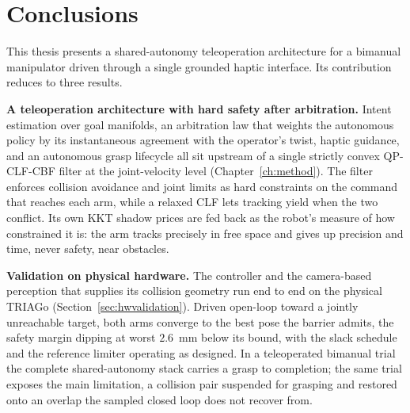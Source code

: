 \chapter{Conclusions}
\label{ch:conclusions}

This thesis presents a shared-autonomy teleoperation architecture for a bimanual manipulator driven through a single grounded haptic interface. Its contribution reduces to three results.

\textbf{A teleoperation architecture with hard safety after arbitration.} Intent estimation over goal manifolds, an arbitration law that weights the autonomous policy by its instantaneous agreement with the operator's twist, haptic guidance, and an autonomous grasp lifecycle all sit upstream of a single strictly convex QP-CLF-CBF filter at the joint-velocity level (Chapter~\ref{ch:method}). The filter enforces collision avoidance and joint limits as hard constraints on the command that reaches each arm, while a relaxed CLF lets tracking yield when the two conflict. Its own KKT shadow prices are fed back as the robot's measure of how constrained it is: the arm tracks precisely in free space and gives up precision and time, never safety, near obstacles.

\textbf{Validation on physical hardware.} The controller and the camera-based perception that supplies its collision geometry run end to end on the physical TRIAGo (Section~\ref{sec:hwvalidation}). Driven open-loop toward a jointly unreachable target, both arms converge to the best pose the barrier admits, the safety margin dipping at worst $2.6$~mm below its bound, with the slack schedule and the reference limiter operating as designed. In a teleoperated bimanual trial the complete shared-autonomy stack carries a grasp to completion; the same trial exposes the main limitation, a collision pair suspended for grasping and restored onto an overlap the sampled closed loop does not recover from.

